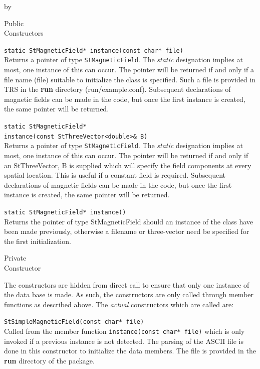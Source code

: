 \documentclass[twoside]{article}
\newcommand{\comp}[1]{\texttt{#1}}%
\newcommand{\entrylabel}[1]{\mbox{\textbf{{#1}}}\hfil}%
\newenvironment{entry}
{\begin{list}{}%
    {\renewcommand{\makelabel}{\entrylabel}%
     \setlength{\labelwidth}{90pt}%
     \setlength{\leftmargin}{\labelwidth}
     \advance\leftmargin by \labelsep%
      }%
    }%
  {\end{list}}
\newcommand{\Entrylabel}[1]%
{\raisebox{0pt}[1ex][0pt]{\makebox[\labelwidth][l]%
    {\parbox[t]{\labelwidth}{\hspace{0pt}\textbf{{#1}}}}}}
\newenvironment{Entry}%
{\renewcommand{\entrylabel}{\Entrylabel}\begin{entry}}%
  {\end{entry}}
\begin{document}
\begin{Entry}
\item[Public \\ Constructors]

   \verb+static StMagneticField* instance(const char* file)+\\
   Returns a pointer of type \comp{StMagneticField}.  The {\em static}
   designation implies at most, one instance of this can occur.
   The pointer will be returned if and only if a file name (file) 
   suitable to initialize the class is specified.  Such a file
   is provided in TRS in the {\bf run} directory (run/example.conf).
   Subsequent 
   declarations of magnetic fields can be made in the code, but
   once the first instance is created, the same pointer will
   be returned.

   \verb+static StMagneticField*+\\
   \verb+instance(const StThreeVector<double>& B)+\\
   Returns a pointer of type \comp{StMagneticField}.  The {\em static}
   designation implies at most, one instance of this can occur.
   The pointer will be returned if and only if an StThreeVector, B
   is supplied which will specify the field components at
   every spatial location.  This is useful if a constant field
   is required.  Subsequent 
   declarations of magnetic fields can be made in the code, but
   once the first instance is created, the same pointer will
   be returned.
   
   \verb+static StMagneticField* instance()+\\
   Returns the pointer of type StMagneticField should an instance
   of the class have been made previously, otherwise a filename
   or three-vector need be specified for the first initialization.

\item[Private \\ Constructor]

   The constructors are hidden from direct call to ensure that
   only one instance of the data base is made.  As such, the
   constructors are only called through member functions
   as described above.  The {\em actual} constructors which are
   called are:

   \verb+StSimpleMagneticField(const char* file)+\\
   Called from the member function \texttt{instance(const char* file)}
   which is only invoked if a previous instance is not detected.
   The parsing of the ASCII file is done in this constructor to
   initialize the data members.  The file is provided in the {\bf run}
   directory of the package.


\end{Entry}
\end{document}
